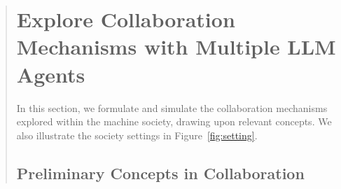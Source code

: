 \documentclass[11pt]{article}
\begin{document}
\begin{abstract}


\section{Explore Collaboration Mechanisms with Multiple LLM Agents}
\label{sec:preliminary}
 
In this section, we formulate and simulate the collaboration mechanisms explored within the machine society, drawing upon relevant concepts. We also illustrate the society settings in Figure~\ref{fig:setting}. 


\subsection{Preliminary Concepts in Collaboration}


\end{abstract}
\end{document}
